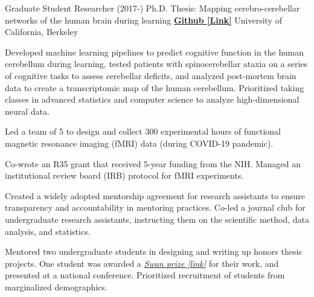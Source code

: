 

\begin{cventries}

  \cventry
    {Graduate Student Researcher (2017-)} %
    {Ph.D. Thesis: Mapping cerebro-cerebellar networks of the human brain during learning}
    {\href{https://github.com/maedbhk/cerebellum_learning_connect}{\textbf{Github [Link]}}}
    {University of California, Berkeley} %
    {
      \begin{cvitems} %
        \item {Developed machine learning pipelines to predict cognitive function in the human cerebellum during learning, tested patients with spinocerebellar ataxia on a series of cognitive tasks to assess cerebellar deficits, and analyzed post-mortem brain data to create a transcriptomic map of the human cerebellum. Prioritized taking classes in advanced statistics and computer science to analyze high-dimensional neural data.} 
        \item {Led a team of 5 to design and collect 300 experimental hours of functional magnetic resonance imaging (fMRI) data (during COVID-19 pandemic).}
        \item {Co-wrote an R35 grant that received 5-year funding from the NIH. Managed an institutional review board (IRB) protocol for fMRI experiments.}
        \item {Created a widely adopted mentorship agreement for research assistants to ensure transparency and accountability in mentoring practices. Co-led a journal club for undergraduate research assistants, instructing them on the scientific method, data analysis, and statistics.}
        \item {Mentored two undergraduate students in designing and writing up honors thesis projects. One student was awarded a \href{https://psychology.berkeley.edu/sites/default/files/undergraduate-program/swanaward_application_2019-2020.pdf}{\textit{Swan prize [link]}} for their work, and presented at a national conference. Prioritized recruitment of students from marginalized demographics.}
      \end{cvitems}
    }
    

\end{cventries}
